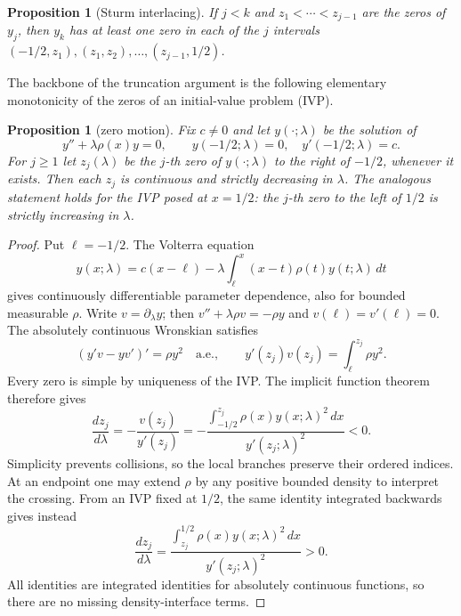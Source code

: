 ﻿\documentclass[11pt]{article}
\newtheorem{proposition}[theorem]{Proposition}
\begin{document}
\begin{proposition}[Sturm interlacing]\label{prop:interl}
	If $j<k$ and $z_1<\cdots<z_{j-1}$ are the zeros of $y_j$, then $y_k$ has
	at least one zero in each of the $j$ intervals
	$(-1/2,z_1),(z_1,z_2),\ldots,(z_{j-1},1/2)$.
\end{proposition}

The backbone of the truncation argument is the following elementary
monotonicity of the zeros of an initial-value problem (IVP).

\begin{proposition}[zero motion]\label{prop:zeromotion}
	Fix $c\neq 0$ and let $y(\cdot;\lambda)$ be the solution of
	\begin{equation*}
		y''+\lambda\rho(x)y=0,\qquad y(-1/2;\lambda)=0,\quad
		y'(-1/2;\lambda)=c.
	\end{equation*}
	For $j\ge 1$ let $z_j(\lambda)$ be the $j$-th zero of $y(\cdot;\lambda)$
	to the right of $-1/2$, whenever it exists.  Then each $z_j$ is
	continuous and \emph{strictly decreasing} in $\lambda$.  The analogous
	statement holds for the IVP posed at $x=1/2$: the $j$-th zero to the
	left of $1/2$ is strictly increasing in $\lambda$.
\end{proposition}

\begin{proof}
 Put $\ell=-1/2$. The Volterra equation
 \[
 y(x;\lambda)=c(x-\ell)-\lambda\int_\ell^x(x-t)\rho(t)y(t;\lambda)\,dt
 \]
 gives continuously differentiable parameter dependence, also for
 bounded measurable $\rho$. Write $v=\partial_\lambda y$; then
 $v''+\lambda\rho v=-\rho y$ and $v(\ell)=v'(\ell)=0$.
 The absolutely continuous Wronskian satisfies
 \[
 (y'v-yv')'=\rho y^2\quad\text{a.e.},\qquad
 y'(z_j)v(z_j)=\int_\ell^{z_j}\rho y^2.
 \]
 Every zero is simple by uniqueness of the IVP. The implicit function
 theorem therefore gives
 \begin{equation}\label{eq:zero-motion}
 \frac{dz_j}{d\lambda}
 =-\frac{v(z_j)}{y'(z_j)}
 =-\frac{\int_{-1/2}^{z_j}\rho(x)y(x;\lambda)^2\,dx}
 {y'(z_j;\lambda)^2}<0.
 \end{equation}
 Simplicity prevents collisions, so the local branches preserve their
 ordered indices. At an endpoint one may extend $\rho$ by any positive
 bounded density to interpret the crossing. From an IVP fixed at $1/2$,
 the same identity integrated backwards gives instead
 \[
 \frac{dz_j}{d\lambda}
 =\frac{\int_{z_j}^{1/2}\rho(x)y(x;\lambda)^2\,dx}
 {y'(z_j;\lambda)^2}>0.
 \]
 All identities are integrated identities for absolutely continuous
 functions, so there are no missing density-interface terms.
\end{proof}
\end{document}
